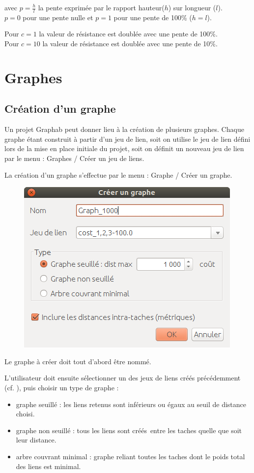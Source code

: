 \documentclass{article}
\begin{document}
avec $p=\frac{h}{l}$ la pente exprimée par le rapport hauteur($h$) sur longueur ($l$).\\ $p=0$ pour une pente nulle et $p=1$ pour une pente de 100\% ($h=l$).

Pour $c=1$ la valeur de résistance est doublée avec une pente de 100\%.\\
Pour $c=10$ la valeur de résistance est doublée avec une pente de 10\%.

\section{Graphes}

\subsection{Création d'un graphe}
Un projet Graphab peut donner lieu à la création de plusieurs graphes. Chaque graphe étant construit à partir d’un jeu de lien, soit on utilise le jeu de lien défini lors de la mise en place initiale du projet, soit on définit un nouveau jeu de lien par le menu : Graphes / Créer un jeu de liens.

La création d’un graphe s’effectue par le menu : Graphe / Créer un graphe. 

\begin{figure}[H]
	\includegraphics[scale=0.5]{img/manual-fr_graph.png} 
\end{figure}

Le graphe à créer doit tout d’abord être nommé.

L’utilisateur doit ensuite sélectionner un des jeux de liens créés précédemment (cf. ), puis choisir un type de graphe :
\begin{itemize}
	\item graphe seuillé : les liens retenus sont inférieurs ou égaux au seuil de distance choisi.
	\item graphe non seuillé : tous les liens sont créés~entre les taches quelle que soit leur distance.
	\item arbre couvrant minimal : graphe reliant toutes les taches dont le poids total des liens est minimal.
\end{itemize}
\end{document}
